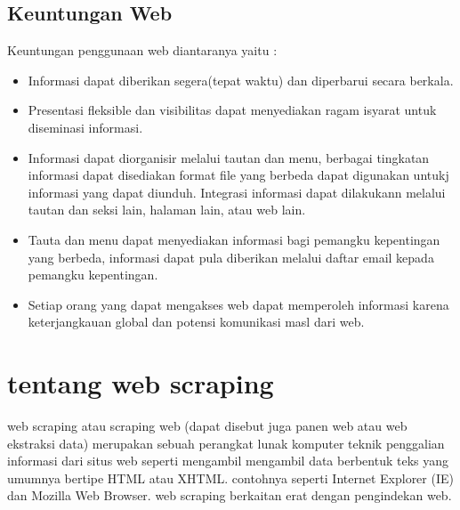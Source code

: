 \subsection{Keuntungan Web}
Keuntungan penggunaan web diantaranya yaitu :
\begin{itemize}
\item Informasi dapat diberikan segera(tepat waktu) dan diperbarui secara berkala.
\item Presentasi fleksible dan visibilitas dapat menyediakan ragam isyarat untuk diseminasi informasi.
\item Informasi dapat diorganisir melalui tautan dan menu, berbagai tingkatan informasi dapat disediakan format file yang berbeda dapat digunakan untukj informasi yang dapat diunduh. Integrasi informasi dapat dilakukann melalui tautan dan seksi lain, halaman lain, atau web lain.
\item Tauta  dan menu dapat menyediakan informasi bagi pemangku kepentingan yang berbeda, informasi dapat pula diberikan melalui daftar email kepada pemangku kepentingan.
\item Setiap orang yang dapat mengakses web dapat memperoleh informasi karena keterjangkauan global dan potensi komunikasi masl dari web.
\end{itemize}
	   
\section{tentang web scraping}
web scraping atau scraping web (dapat disebut juga panen web atau web ekstraksi data) merupakan sebuah
perangkat lunak komputer teknik penggalian informasi dari situs web seperti mengambil mengambil data
berbentuk teks yang umumnya bertipe HTML atau XHTML. contohnya seperti Internet Explorer (IE) dan Mozilla Web
Browser. web scraping berkaitan erat dengan pengindekan web.

